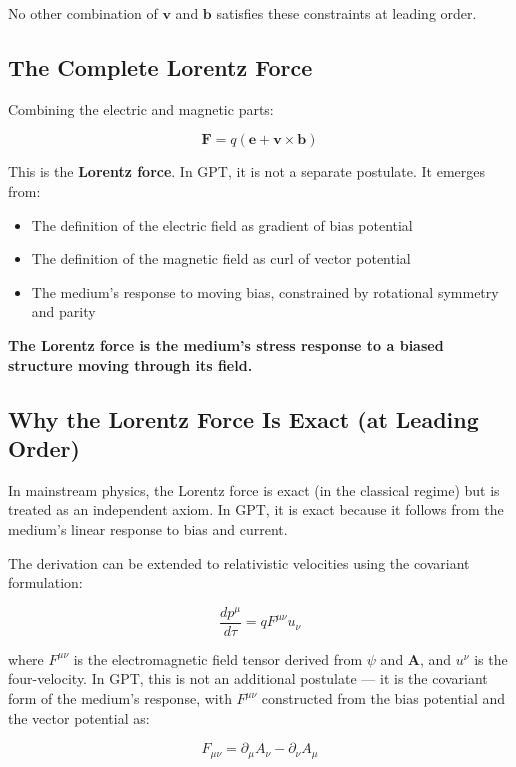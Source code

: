 \documentclass[12pt, a4paper]{article}
\begin{document}
No other combination of \( \mathbf{v} \) and \( \mathbf{b} \) satisfies these constraints at leading order.

\subsection{The Complete Lorentz Force}
\label{subsec:complete_lorentz}

Combining the electric and magnetic parts:

\[
\mathbf{F} = q (\mathbf{e} + \mathbf{v} \times \mathbf{b})
\]

This is the \textbf{Lorentz force}. In GPT, it is not a separate postulate. It emerges from:
\begin{itemize}
    \item The definition of the electric field as gradient of bias potential
    \item The definition of the magnetic field as curl of vector potential
    \item The medium's response to moving bias, constrained by rotational symmetry and parity
\end{itemize}

\textbf{The Lorentz force is the medium's stress response to a biased structure moving through its field.}

\subsection{Why the Lorentz Force Is Exact (at Leading Order)}
\label{subsec:lorentz_exact}

In mainstream physics, the Lorentz force is exact (in the classical regime) but is treated as an independent axiom. In GPT, it is exact because it follows from the medium's linear response to bias and current.

The derivation can be extended to relativistic velocities using the covariant formulation:

\[
\frac{dp^\mu}{d\tau} = q F^{\mu\nu} u_\nu
\]

where \( F^{\mu\nu} \) is the electromagnetic field tensor derived from \( \psi \) and \( \mathbf{A} \), and \( u^\nu \) is the four-velocity. In GPT, this is not an additional postulate — it is the covariant form of the medium's response, with \( F^{\mu\nu} \) constructed from the bias potential and the vector potential as:

\[
F_{\mu\nu} = \partial_\mu A_\nu - \partial_\nu A_\mu
\]
\end{document}
